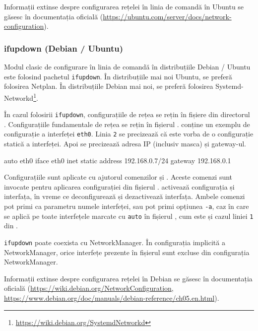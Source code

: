 Informații extinse despre configurarea rețelei în linia de comandă în Ubuntu se găsesc în documentația oficială (\url{https://ubuntu.com/server/docs/network-configuration}).

\subsubsection{ifupdown (Debian / Ubuntu)}
\label{sec:net:linux-config:cli:ifupdown}

Modul clasic de configurare în linia de comandă în distribuțiile Debian / Ubuntu este folosind pachetul \texttt{ifupdown}.
În distribuțiile mai noi Ubuntu, se preferă folosirea Netplan.
În distribuțiile Debian mai noi, se preferă folosirea Systemd-Networkd\footnote{\url{https://wiki.debian.org/SystemdNetworkd}}.

În cazul folosirii \texttt{ifupdown}, configurațiile de rețea se rețin în fișiere din directorul .
Configurațiile fundamentale de rețea se rețin în fișierul .
 conține un exemplu de configurație a interfeței \texttt{eth0}.
Linia \texttt{2} se precizează că este vorba de o configurație statică a interfeței.
Apoi se precizează adresa IP (inclusiv masca) și gateway-ul.

\begin{screen}[caption={Configurație ifupdown în /etc/network/interfaces},label={lst:net:ifupdown}]
auto eth0
iface eth0 inet static
	address 192.168.0.7/24
	gateway 192.168.0.1
\end{screen}

Configurațiile sunt aplicate cu ajutorul comenzilor  și .
Aceste comenzi sunt invocate pentru aplicarea configurației din fișierul .
 activează configurația și interfața, în vreme ce  deconfigurează și dezactivează interfața.
Ambele comenzi pot primi ca parametru numele interfeței, sau pot primi opțiunea \texttt{-a}, caz în care se aplică pe toate interfețele marcate cu \texttt{auto} în fișierul , cum este și cazul liniei \texttt{1} din .

\texttt{ifupdown} poate coexista cu NetworkManager.
În configurația implicită a NetworkManager, orice interfețe prezente în fișierul  sunt excluse din configurația NetworkManager.

Informații extinse despre configurarea rețelei în Debian se găsesc în documentația oficială (\url{https://wiki.debian.org/NetworkConfiguration}, \url{https://www.debian.org/doc/manuals/debian-reference/ch05.en.html}).

